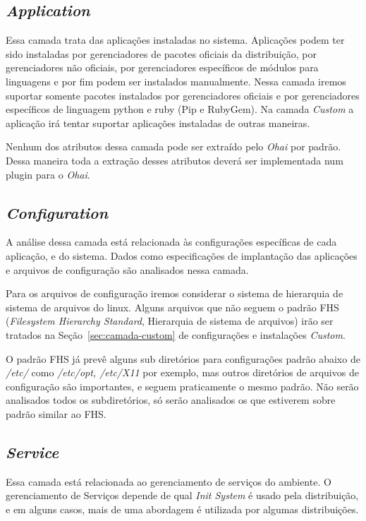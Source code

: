 \subsection{\textit{Application}}

Essa camada trata das aplicações instaladas no sistema. Aplicações podem ter 
sido instaladas por gerenciadores de pacotes oficiais da distribuição, por
gerenciadores não oficiais, por gerenciadores específicos de módulos para
linguagens e por fim podem ser instalados manualmente. Nessa camada iremos 
suportar somente pacotes instalados por gerenciadores oficiais e por 
gerenciadores específicos de linguagem python e ruby (Pip e RubyGem). Na camada
\textit{Custom} a aplicação irá tentar suportar aplicações instaladas de outras
maneiras.


Nenhum dos atributos dessa camada pode ser extraído pelo \textit{Ohai} por
padrão. Dessa maneira toda a extração desses atributos deverá ser implementada
num plugin para o \textit{Ohai}.

\subsection{\textit{Configuration}}

A análise dessa camada está relacionada às configurações específicas de cada 
aplicação, e do sistema. Dados como especificações de implantação das
aplicações e arquivos de configuração são analisados nessa camada.

Para os arquivos de configuração iremos considerar  o sistema de hierarquia de
sistema de arquivos do linux. Alguns arquivos que não seguem o padrão FHS 
(\textit{Filesystem Hierarchy Standard}, Hierarquia de sistema de arquivos) irão
ser tratados na Seção~\ref{sec:camada-custom} de configurações e instalações \textit{Custom}.

O padrão FHS já prevê alguns sub diretórios para configurações padrão abaixo de
\textit{/etc/} como \textit{/etc/opt, /etc/X11} por exemplo, mas outros diretórios
de arquivos de configuração são importantes, e seguem praticamente o mesmo padrão.
Não serão analisados todos os subdiretórios, só serão analisados os que estiverem
sobre padrão similar ao FHS.

\subsection{\textit{Service}}

Essa camada está relacionada ao gerenciamento de serviços do ambiente.
O gerenciamento de Serviços depende de qual \textit{Init System} é usado pela
distribuição, e em alguns casos, mais de uma abordagem é utilizada por algumas
distribuições.

